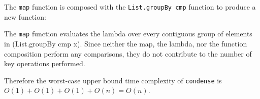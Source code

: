 \documentclass[../main.tex]{subfiles}
\begin{document}
The \texttt{map} function is composed with the \texttt{List.groupBy cmp} function to produce a new function:

The \texttt{map} function evaluates the lambda over every contiguous group of elements in (List.groupBy cmp x).  Since
neither the map, the lambda, nor the function composition perform any comparisons, they do not contribute to the number
of key operations performed.

Therefore the worst-case upper bound time complexity of \texttt{condense} is $O(1) + O(1) + O(1) + O(n) = O(n)$.
\qedsymbol

\end{document}
